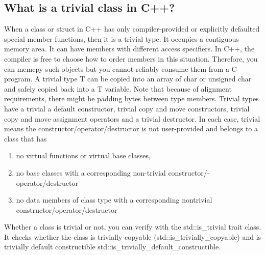 \documentclass{report}
\begin{document}
\subsection{ What is a trivial class in C++?}
\bigbreak \noindent 
When a class or struct in C++ has only compiler-provided or
explicitly defaulted special member functions, then it is a trivial
type. It occupies a contiguous memory area. It can have members
with different access specifiers. In C++, the compiler is free to
choose how to order members in this situation. Therefore, you can
memcpy such objects but you cannot reliably consume them from a
C program. A trivial type T can be copied into an array of char or
unsigned char and safely copied back into a T variable. Note that
because of alignment requirements, there might be padding bytes
between type members.
\bigbreak \noindent 
Trivial types have a trivial a default constructor, trivial copy and
move constructors, trivial copy and move assignment operators and
a trivial destructor. In each case, trivial means the constructor/operator/destructor is not user-provided and belongs to a class that
has
\begin{enumerate}
    \item no virtual functions or virtual base classes,
    \item no base classes with a corresponding non-trivial constructor/- operator/destructor
    \item no data members of class type with a corresponding nontrivial constructor/operator/destructor
\end{enumerate}
\bigbreak \noindent 
Whether a class is trivial or not, you can verify with the std::is\_trivial trait class. It checks whether the class is trivially copyable
(std::is\_trivially\_copyable) and is trivially default constructible
std::is\_trivially\_default\_constructible.

\pagebreak 
{}
\bigbreak \noindent 
\end{document}
